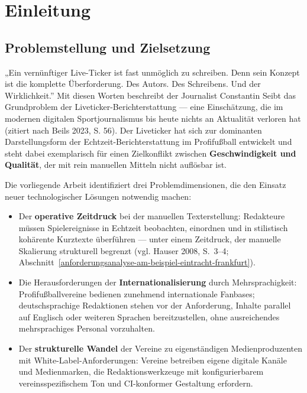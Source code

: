 \chapter{Einleitung}\label{einleitung}

\section{Problemstellung und
Zielsetzung}\label{problemstellung-und-zielsetzung}

„Ein vernünftiger Live-Ticker ist fast unmöglich zu schreiben. Denn sein
Konzept ist die komplette Überforderung. Des Autors. Des Schreibens. Und
der Wirklichkeit.'' Mit diesen Worten beschreibt der Journalist
Constantin Seibt das Grundproblem der Liveticker-Berichterstattung ---
eine Einschätzung, die im modernen digitalen Sportjournalismus bis heute
nichts an Aktualität verloren hat (zitiert nach Beils 2023, S. 56). Der
Liveticker hat sich zur dominanten Darstellungsform der
Echtzeit-Berichterstattung im Profifußball entwickelt und steht dabei
exemplarisch für einen Zielkonflikt zwischen \textbf{Geschwindigkeit und
Qualität}, der mit rein manuellen Mitteln nicht auflösbar ist.

Die vorliegende Arbeit identifiziert drei Problemdimensionen, die den
Einsatz neuer technologischer Lösungen notwendig machen:

\begin{itemize}
\tightlist
\item
  Der \textbf{operative Zeitdruck} bei der manuellen Texterstellung:
  Redakteure müssen Spielereignisse in Echtzeit beobachten, einordnen
  und in stilistisch kohärente Kurztexte überführen — unter einem
  Zeitdruck, der manuelle Skalierung strukturell begrenzt
  (vgl. Hauser 2008, S.~3--4; Abschnitt~\ref{anforderungsanalyse-am-beispiel-eintracht-frankfurt}).
\item
  Die Herausforderungen der \textbf{Internationalisierung} durch
  Mehrsprachigkeit: Profifußballvereine bedienen zunehmend
  internationale Fanbases; deutschsprachige Redaktionen stehen vor der
  Anforderung, Inhalte parallel auf Englisch oder weiteren Sprachen
  bereitzustellen, ohne ausreichendes mehrsprachiges Personal vorzuhalten.
\item
  Der \textbf{strukturelle Wandel} der Vereine zu eigenständigen
  Medienproduzenten mit White-Label-Anforderungen: Vereine betreiben
  eigene digitale Kanäle und Medienmarken, die Redaktionswerkzeuge mit
  konfigurierbarem vereinsspezifischem Ton und CI-konformer Gestaltung
  erfordern.
\end{itemize}

